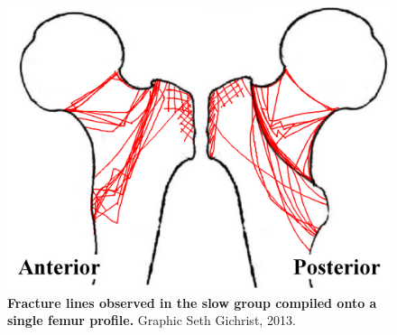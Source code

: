 \begin{figure}
	\centering
	\includegraphics[width=0.7\linewidth]{./fracture/Figures/NishiyamaFractures.eps}
	\caption[Slow group fracture lines]{\textbf{Fracture lines observed in the slow group compiled onto a single femur profile.} Graphic \textcopyright Seth Gichrist, 2013.}
	\label{fig:NishiyamaFractures}
\end{figure}

